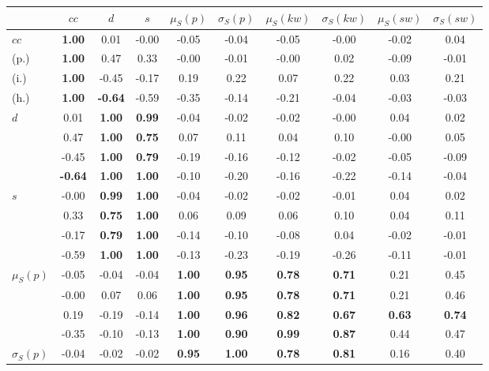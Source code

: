 \begin{table*}[h!]
\begin{center}
\begin{tabular}{| l || c | c | c | c | c | c | c | c | c |}\hline
 & $cc$ & $d$ & $s$ & $\mu_S(p)$ & $\sigma_S(p)$ & $\mu_S(kw)$ & $\sigma_S(kw)$ & $\mu_S(sw)$ & $\sigma_S(sw)$ \\\hline\hline
$cc$ & {\bf 1.00} & 0.01 & -0.00 & -0.05 & -0.04 & -0.05 & -0.00 & -0.02 & 0.04 \\
(p.) & {\bf 1.00} & 0.47 & 0.33 & -0.00 & -0.01 & -0.00 & 0.02 & -0.09 & -0.01 \\
(i.) & {\bf 1.00} & -0.45 & -0.17 & 0.19 & 0.22 & 0.07 & 0.22 & 0.03 & 0.21 \\
(h.) & {\bf 1.00} & {\bf -0.64} & -0.59 & -0.35 & -0.14 & -0.21 & -0.04 & -0.03 & -0.03 \\\hline
$d$ & 0.01 & {\bf 1.00} & {\bf 0.99} & -0.04 & -0.02 & -0.02 & -0.00 & 0.04 & 0.02 \\
 & 0.47 & {\bf 1.00} & {\bf 0.75} & 0.07 & 0.11 & 0.04 & 0.10 & -0.00 & 0.05 \\
 & -0.45 & {\bf 1.00} & {\bf 0.79} & -0.19 & -0.16 & -0.12 & -0.02 & -0.05 & -0.09 \\
 & {\bf -0.64} & {\bf 1.00} & {\bf 1.00} & -0.10 & -0.20 & -0.16 & -0.22 & -0.14 & -0.04 \\\hline
$s$ & -0.00 & {\bf 0.99} & {\bf 1.00} & -0.04 & -0.02 & -0.02 & -0.01 & 0.04 & 0.02 \\
 & 0.33 & {\bf 0.75} & {\bf 1.00} & 0.06 & 0.09 & 0.06 & 0.10 & 0.04 & 0.11 \\
 & -0.17 & {\bf 0.79} & {\bf 1.00} & -0.14 & -0.10 & -0.08 & 0.04 & -0.02 & -0.01 \\
 & -0.59 & {\bf 1.00} & {\bf 1.00} & -0.13 & -0.23 & -0.19 & -0.26 & -0.11 & -0.01 \\\hline
$\mu_S(p)$ & -0.05 & -0.04 & -0.04 & {\bf 1.00} & {\bf 0.95} & {\bf 0.78} & {\bf 0.71} & 0.21 & 0.45 \\
 & -0.00 & 0.07 & 0.06 & {\bf 1.00} & {\bf 0.95} & {\bf 0.78} & {\bf 0.71} & 0.21 & 0.46 \\
 & 0.19 & -0.19 & -0.14 & {\bf 1.00} & {\bf 0.96} & {\bf 0.82} & {\bf 0.67} & {\bf 0.63} & {\bf 0.74} \\
 & -0.35 & -0.10 & -0.13 & {\bf 1.00} & {\bf 0.90} & {\bf 0.99} & {\bf 0.87} & 0.44 & 0.47 \\\hline
$\sigma_S(p)$ & -0.04 & -0.02 & -0.02 & {\bf 0.95} & {\bf 1.00} & {\bf 0.78} & {\bf 0.81} & 0.16 & 0.40 \\

\end{tabular}
\end{center}
\end{table*}

